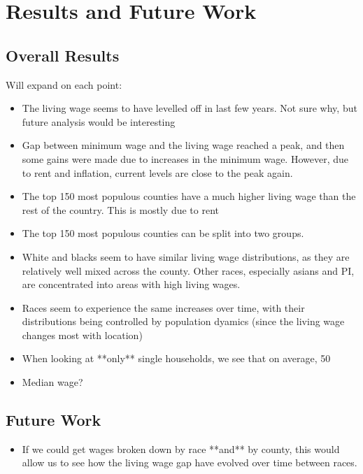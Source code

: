 \chapter{Results and Future Work}\label{ch:results}

\section{Overall Results}

Will expand on each point:

\begin{itemize}
\item The living wage seems to have levelled off in last few years. Not sure why, but future analysis would be interesting
\item Gap between minimum wage and the living wage reached a peak, and then some gains were made due to increases in the minimum wage. However, due to rent and inflation, current levels are close to the peak again.
\item The top 150 most populous counties have a much higher living wage than the rest of the country. This is mostly due to rent
\item The top 150 most populous counties can be split into two groups. 
\item White and blacks seem to have similar living wage distributions, as they are relatively well mixed across the county. Other races, especially asians and PI, are concentrated into areas with high living wages.
\item Races seem to experience the same increases over time, with their distributions being controlled by population dyamics (since the living wage changes most with location)
\item When looking at **only** single households, we see that on average, 50%

\item Median wage?
\end{itemize}



\section{Future Work}

\begin{itemize}
\item If we could get wages broken down by race **and** by county, this would allow us to see how the living wage gap have evolved over time between races. 
\end{itemize}